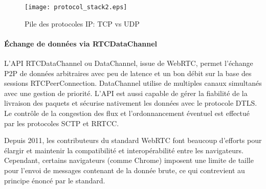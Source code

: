 \begin{figure}[ht]
	\centering
	\texttt{[image: protocol\_stack2.eps]}
	\caption{Pile des protocoles IP: TCP vs UDP}
	\label{fig:protocolstack}
\end{figure}
\paragraph{Échange de données via RTCDataChannel}
L'\gls{API} RTCDataChannel ou Data\-Channel, issue de  WebRTC, 
permet l'échange \gls{P2P} de données arbitraires avec peu de latence et 
un bon débit sur la base des sessions RTCPeerConnection.
DataChannel utilise de multiples canaux simultanés avec une gestion de 
priorité. L'\gls{API} est aussi capable de gérer la fiabilité de la livraison des 
paquets et sécurise nativement les données avec le protocole 
\gls{DTLS}. 
Le contrôle de la congestion des flux et l'ordonnancement éventuel est 
effectué par les protocoles \gls{SCTP} et \gls{RRTCC}. 


Depuis 2011, les contributeurs du standard WebRTC font beaucoup 
d'efforts pour élargir et maintenir la compatibilité et interopérabilité entre les navigateurs.
Cependant, certains navigateurs (comme Chrome) imposent une limite de taille 
pour l'envoi de messages contenant de la donnée brute, ce qui contrevient au 
principe énoncé par le standard.

